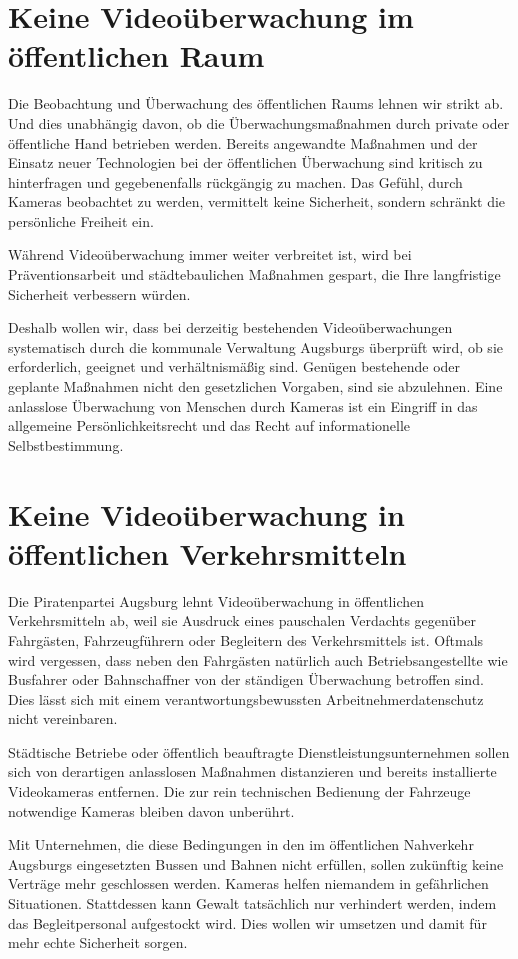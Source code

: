   \section{Keine Videoüberwachung im öffentlichen Raum}
  
  Die Beobachtung und Überwachung des öffentlichen Raums lehnen wir strikt ab. 
  Und dies unabhängig davon, ob die Überwachungsmaßnahmen durch private oder 
  öffentliche Hand betrieben werden. Bereits angewandte Maßnahmen und der 
  Einsatz neuer Technologien bei der öffentlichen Überwachung sind kritisch zu 
  hinterfragen und gegebenenfalls rückgängig zu machen. Das Gefühl, durch 
  Kameras beobachtet zu werden, vermittelt keine Sicherheit, sondern schränkt 
  die persönliche Freiheit ein.
  
  Während Videoüberwachung immer weiter verbreitet ist, wird bei 
  Präventionsarbeit und städtebaulichen Maßnahmen gespart, die Ihre 
  langfristige Sicherheit verbessern würden.
  
  Deshalb wollen wir, dass bei derzeitig bestehenden Videoüberwachungen 
  systematisch durch die kommunale Verwaltung Augsburgs überprüft wird, ob sie 
  erforderlich, geeignet und verhältnismäßig sind. Genügen bestehende oder 
  geplante Maßnahmen nicht den gesetzlichen Vorgaben, sind sie abzulehnen. 
  Eine anlasslose Überwachung von Menschen durch Kameras ist ein Eingriff in 
  das allgemeine Persönlichkeitsrecht und das Recht auf informationelle 
  Selbstbestimmung. 
  
  \section{Keine Videoüberwachung in öffentlichen Verkehrsmitteln}
  
  Die Piratenpartei Augsburg lehnt Videoüberwachung in öffentlichen 
  Verkehrsmitteln ab, weil sie Ausdruck eines pauschalen Verdachts gegenüber 
  Fahrgästen, Fahrzeugführern oder Begleitern des Verkehrsmittels ist. Oftmals 
  wird vergessen, dass neben den Fahrgästen natürlich auch Betriebsangestellte 
  wie Busfahrer oder Bahnschaffner von der ständigen Überwachung betroffen 
  sind. Dies lässt sich mit einem verantwortungsbewussten 
  Arbeitnehmerdatenschutz nicht vereinbaren.
  
  Städtische Betriebe oder öffentlich beauftragte Dienstleistungsunternehmen 
  sollen sich von derartigen anlasslosen Maßnahmen distanzieren und bereits 
  installierte Videokameras entfernen. Die zur rein technischen Bedienung der 
  Fahrzeuge notwendige Kameras bleiben davon unberührt.
  
  Mit Unternehmen, die diese Bedingungen in den im öffentlichen Nahverkehr 
  Augsburgs eingesetzten Bussen und Bahnen nicht erfüllen, sollen zukünftig 
  keine Verträge mehr geschlossen werden. Kameras helfen niemandem in 
  gefährlichen Situationen. Stattdessen kann Gewalt tatsächlich nur verhindert 
  werden, indem das Begleitpersonal aufgestockt wird. Dies wollen wir umsetzen 
  und damit für mehr echte Sicherheit sorgen. 